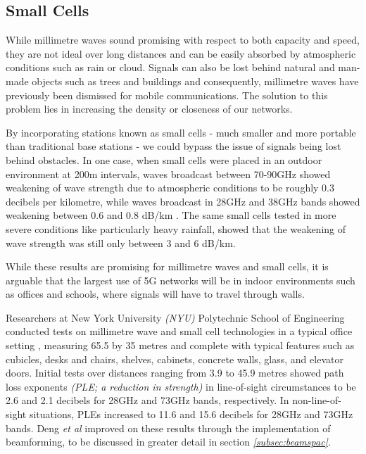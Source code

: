 \documentclass[journal]{IEEEtran}
\begin{document}
\subsection{Small Cells}\label{subsec:smallcells}

While millimetre waves sound promising with respect to both capacity and speed, they are not ideal over long distances and can be easily absorbed by atmospheric conditions such as rain or cloud. Signals can also be lost behind natural and man-made objects such as trees and buildings and consequently, millimetre waves have previously been dismissed for mobile communications. The solution to this problem lies in increasing the density or closeness of our networks. 

By incorporating stations known as small cells - much smaller and more portable than traditional base stations - we could bypass the issue of signals being lost behind obstacles. In one case, when small cells were placed in an outdoor environment at 200m intervals, waves broadcast between 70-90GHz showed weakening of wave strength due to atmospheric conditions to be roughly 0.3 decibels per kilometre, while waves broadcast in 28GHz and 38GHz bands showed weakening between 0.6 and 0.8 dB/km \cite{mmwave}. The same small cells tested in more severe conditions like particularly heavy rainfall, showed that the weakening of wave strength was still only between 3 and 6 dB/km. 

While these results are promising for millimetre waves and small cells, it is arguable that the largest use of 5G networks will be in indoor environments such as offices and schools, where signals will have to travel through walls. 

Researchers at New York University \textit{(NYU)} Polytechnic School of Engineering conducted tests on millimetre wave and small cell technologies in a typical office setting \cite{28_73ghz}, measuring 65.5 by 35 metres and complete with typical features such as cubicles, desks and chairs, shelves, cabinets, concrete walls, glass, and elevator doors. Initial tests over distances ranging from 3.9 to 45.9 metres showed path loss exponents \textit{(PLE; a reduction in strength)} in line-of-sight circumstances to be 2.6 and 2.1 decibels for 28GHz and 73GHz bands, respectively. In non-line-of-sight situations, PLEs increased to 11.6 and 15.6 decibels for 28GHz and 73GHz bands. Deng \textit{et al} improved on these results through the implementation of beamforming, to be discussed in greater detail in section \textit{\ref{subsec:beamspac}}.
\end{document}

